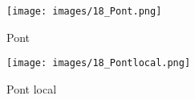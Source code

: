     \begin{figure}
    \center
    \texttt{[image: images/18\_Pont.png]}
    \caption{\label{Pont} Pont}
    \end{figure}
    
    \begin{figure}
    \center
    \texttt{[image: images/18\_Pontlocal.png]}
    \caption{\label{Pontlocal} Pont local}
    \end{figure}
